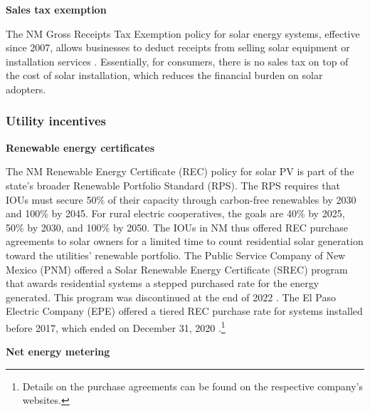 \documentclass[11pt,twoside,letterpaper]{article}
\begin{document}
\noindent\textbf{Sales tax exemption}

The NM Gross Receipts Tax Exemption policy for solar energy systems, effective since 2007, allows businesses to deduct receipts from selling solar equipment or installation services \parencite{NMStat2021}. Essentially, for consumers, there is no sales tax on top of the cost of solar installation, which reduces the financial burden on solar adopters.


\subsubsection{Utility incentives}

\noindent\textbf{Renewable energy certificates}

The NM Renewable Energy Certificate (REC) policy for solar PV is part of the state's broader Renewable Portfolio Standard (RPS). The RPS requires that IOUs must secure 50\% of their capacity through carbon-free renewables by 2030 and 100\% by 2045. For rural electric cooperatives, the goals are 40\% by 2025, 50\% by 2030, and 100\% by 2050. The IOUs in NM thus offered REC purchase agreements to solar owners for a limited time to count residential solar generation toward the utilities' renewable portfolio. The Public Service Company of New Mexico (PNM) offered a Solar Renewable Energy Certificate (SREC) program that awards residential systems a stepped purchased rate for the energy generated. This program was discontinued at the end of 2022 \parencite{pnmrec}. The El Paso Electric Company (EPE) offered a tiered REC purchase rate for systems installed before 2017, which ended on December 31, 2020 \parencite{eperec, eperecmid}.\footnote{Details on the purchase agreements can be found on the respective company's websites.}

\noindent\textbf{Net energy metering}
\end{document}
